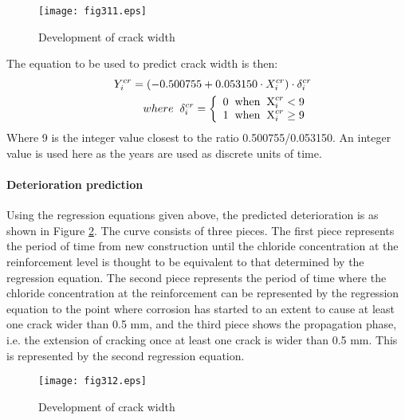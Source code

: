 \begin{figure}[h]
\texttt{[image: fig311.eps]}
\caption{Development of crack width}
\label{fig:311}
\end{figure}
The equation to be used to predict crack width is then:
\begin{eqnarray}
 && Y_i^{cr} = ( - 0.500755 + 0.053150 \cdot X_i^{cr}) \cdot \delta _i^{cr} \label{eq3227}\\
 && where{\rm{\hspace{2mm} }}\delta _i^{cr} = \left\{ {\begin{array}{*{20}{c}}
{0{\rm{ \hspace{2mm}  when \hspace{2mm} X}}_i^{cr} < 9}\\
{1{\rm{ \hspace{2mm}  when \hspace{2mm}  X}}_i^{cr} \ge 9{\rm{ }}}
\end{array}} \right.
\end{eqnarray}
Where 9 is the integer value closest to the ratio 0.500755/0.053150. An integer value is used here as the years are used as discrete units of time.
%
\paragraph{Deterioration prediction}

Using the regression equations given above, the predicted deterioration is as shown in Figure \ref{fig:312}. The curve consists of three pieces. The first piece represents the period of time from new construction until the chloride concentration at the reinforcement level is thought to be equivalent to that determined by the regression equation. The second piece represents the period of time where the chloride concentration at the reinforcement can be represented by the regression equation to the point where corrosion has started to an extent to cause at least one crack wider than 0.5 mm, and the third piece shows the propagation phase, i.e. the extension of cracking once at least one crack is wider than 0.5 mm. This is represented by the second regression equation.
\begin{figure}[h]
\texttt{[image: fig312.eps]}
\caption{Development of crack width}
 \label{fig:312}
\end{figure}
